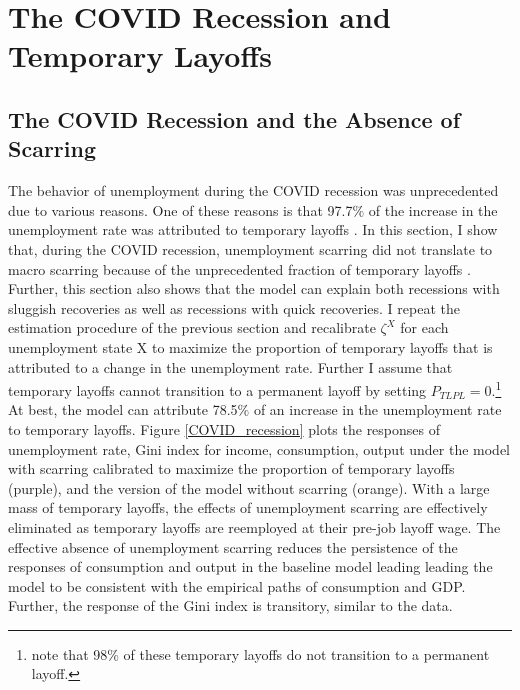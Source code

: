 


\section{The COVID Recession and Temporary Layoffs}


\subsection{The COVID Recession and the Absence of Scarring}

The behavior of unemployment during the COVID recession was unprecedented due to various reasons. One of these reasons is that 97.7$\%$ of the increase in the unemployment rate was attributed to temporary layoffs \citep{Gertler2022}. In this section, I show that, during the COVID recession, unemployment scarring did not translate to macro scarring because of the unprecedented fraction of temporary layoffs . Further, this section also shows that the model can explain both recessions with sluggish recoveries as well as recessions with quick recoveries. I repeat the estimation procedure of the previous section and recalibrate $\zeta^{X}$ for each unemployment state X to maximize the proportion of temporary layoffs that is attributed to a change in the unemployment rate. Further I assume that temporary layoffs cannot transition to a permanent layoff by setting $P_{TLPL} = 0$.\footnote{\cite{Gertler2022} note that 98$\%$ of these temporary layoffs do not transition to a permanent layoff.} At best, the model can attribute 78.5$\%$ of an increase in the unemployment rate to temporary layoffs.  Figure \ref{COVID_recession} plots the responses of unemployment rate, Gini index for income, consumption, output under the model with scarring calibrated to maximize the proportion of temporary layoffs (purple), and the version of the model without scarring (orange). With a large mass of temporary layoffs, the effects of unemployment scarring are effectively eliminated as temporary layoffs are reemployed at their pre-job layoff wage. The effective absence of unemployment scarring reduces the persistence of the responses of consumption and output in the baseline model leading leading the model to be consistent with the empirical paths of consumption and GDP. Further, the response of the Gini index is transitory, similar to the data. 

 

